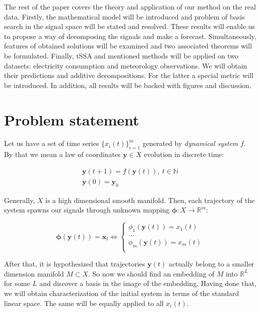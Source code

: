 \documentclass[referee, pdflatex]{sn-jnl}
\theoremstyle{definition}
\theoremstyle{plain}
\begin{document}
	The rest of the paper covers the theory and application of our method on the real data. Firstly, the mathematical model will be introduced and problem of basis search in the signal space will be stated and resolved. These results will enable us to propose a way of decomposing the signals and make a forecast. Simultaneously, features of obtained solutions will be examined and two associated theorems will be formulated. Finally, tSSA and mentioned methods will be applied on two datasets: electricity consumption and meteorology observations. We will obtain their predictions and additive decompositions. For the latter a special metric will be introduced. In addition, all results will be backed with figures and discussion.
	
	\section{Problem statement}\label{sec:problem_statement}
	
	Let us have a set of time series $ \{x_i(t)\}_{i=1}^m $ generated by \emph{dynamical system} $ f $. By that we mean a law of coordinates $ \mathbf{y} \in X $ evolution in discrete time:
	
	\begin{gather*}
		\mathbf{y}(t + 1) = f(\mathbf{y}(t)), \ t \in \mathbb{N} \\
		\mathbf{y}(0) = \mathbf{y}_0
	\end{gather*}
	
	Generally, $ X $ is a high dimensional smooth manifold. Then, each trajectory of the system spawns our signals through unknown mapping $ \boldsymbol{\phi}: X \to \mathbb{R}^m $:
	
	\begin{equation*}
		\boldsymbol{\phi}(\mathbf{y}(t)) = \mathbf{x}_t \Leftrightarrow \begin{cases}
			\phi_1(\mathbf{y}(t)) = x_1(t) \\
			\ldots \\
			\phi_m(\mathbf{y}(t)) = x_m(t) \\
		\end{cases}
	\end{equation*}
	
	After that, it is hypothesized that trajectories $ \mathbf{y}(t) $ actually belong to a smaller dimension manifold $ M \subset X $. So now we should find an embedding of $ M $ into $ \mathbb{R}^{L} $ for some $ L $ and discover a basis in the image of the embedding. Having done that, we will obtain characterization of the initial system in terms of the standard linear space. The same will be equally applied to all $ x_i(t) $.
	
\end{document}
